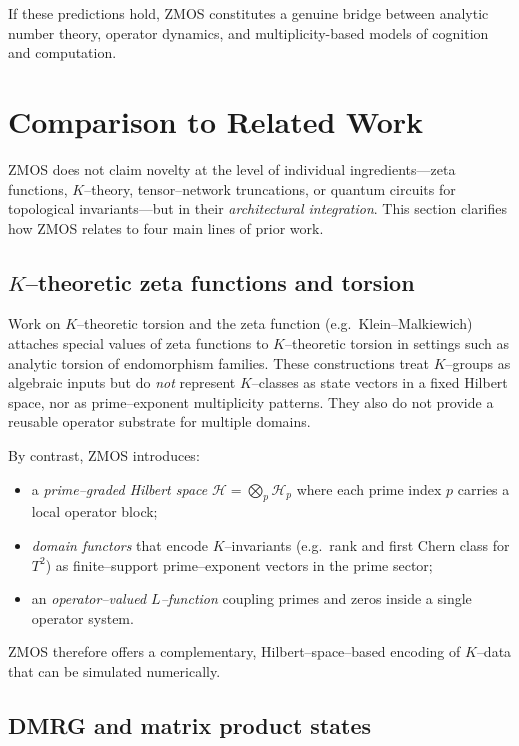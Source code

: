 \documentclass[11pt]{article}
\begin{document}
If these predictions hold, ZMOS constitutes a genuine bridge between
analytic number theory, operator dynamics, and multiplicity-based
models of cognition and computation.

\section{Comparison to Related Work}
\label{sec:related-work}

ZMOS does not claim novelty at the level of individual ingredients---zeta functions, $K$--theory, tensor--network truncations, or quantum circuits for topological invariants---but in their \emph{architectural integration}. This section clarifies how ZMOS relates to four main lines of prior work.

\subsection{$K$--theoretic zeta functions and torsion}

Work on $K$--theoretic torsion and the zeta function (e.g.\ Klein--Malkiewich) attaches special values of zeta functions to $K$--theoretic torsion in settings such as analytic torsion of endomorphism families.
These constructions treat $K$--groups as algebraic inputs but do \emph{not} represent $K$--classes as state vectors in a fixed Hilbert space, nor as prime--exponent multiplicity patterns.
They also do not provide a reusable operator substrate for multiple domains.

By contrast, ZMOS introduces:
\begin{itemize}
  \item a \emph{prime--graded Hilbert space} $\mathcal{H} = \bigotimes_{p} \mathcal{H}_p$ where each prime index $p$ carries a local operator block;
  \item \emph{domain functors} that encode $K$--invariants (e.g.\ rank and first Chern class for $T^2$) as finite--support prime--exponent vectors in the prime sector;
  \item an \emph{operator--valued $L$--function} coupling primes and zeros inside a single operator system.
\end{itemize}
ZMOS therefore offers a complementary, Hilbert--space--based encoding of $K$--data that can be simulated numerically.

\subsection{DMRG and matrix product states}
\end{document}
